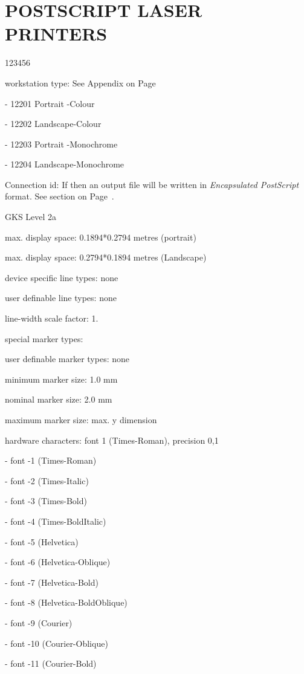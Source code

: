 \section{POSTSCRIPT LASER PRINTERS}
\begin{DLtt}{123456}
\item[workstation type:]See Appendix on Page~\pageref{sec:gtstyp}
\item[-]12201 Portrait -Colour
\item[-]12202 Landscape-Colour
\item[-]12203 Portrait -Monochrome
\item[-]12204 Landscape-Monochrome
\item[Connection id:]If  then an output file will be written in
{\em Encapsulated PostScript}      format. See section on Page~\pageref{sec:epsref}.
\item[GKS Level]2a
\item[max. display space:]0.1894*0.2794 metres (portrait)
\item[max. display space:]0.2794*0.1894 metres (Landscape)
\item[device specific line types:]none
\item[user definable line types:]none
\item[line-width scale factor:]1.
\item[special marker types:]
\item[user definable marker types:]none
\item[minimum marker size:]1.0 mm
\item[nominal marker size:]2.0 mm
\item[maximum marker size:]max. y dimension
\item[hardware characters:]font 1 (Times-Roman), precision 0,1
\item[-]font -1 (Times-Roman)
\item[-]font -2 (Times-Italic)
\item[-]font -3 (Times-Bold)
\item[-]font -4 (Times-BoldItalic)
\item[-]font -5 (Helvetica)
\item[-]font -6 (Helvetica-Oblique)
\item[-]font -7 (Helvetica-Bold)
\item[-]font -8 (Helvetica-BoldOblique)
\item[-]font -9 (Courier)
\item[-]font -10 (Courier-Oblique)
\item[-]font -11 (Courier-Bold)

\end{DLtt}

